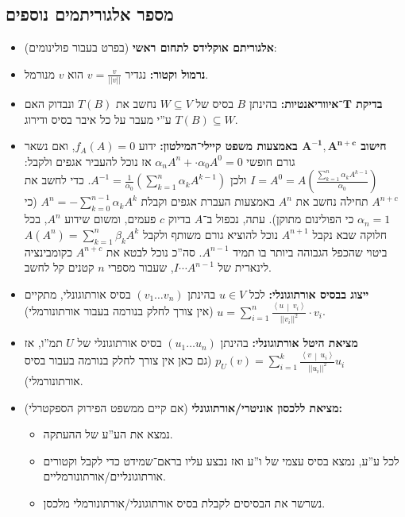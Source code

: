 \documentclass[a4paper]{article}
\newcommand\ra    {\rangle}
\newcommand\la    {\langle}
\newcommand\sumnko    {\sum_{k = 1}^{n}}
\newcommand\sumnio    {\sum_{i = 1}^{n}}
\newcommand\norm[1]   {\left \vert \left \vert #1 \right \vert \right \vert}
\newcommand\mut [2]   {\left \la #1 \,\middle\vert\, #2 \right \ra}
\newcommand\ag        {\alpha}
\newcommand\bg        {\beta}
\newcommand\op    {^{-1}}
\newcommand\cl [1]    {\left ( #1 \right )}
\theoremstyle{definition}
\begin{document}
	\subsection{מספר אלגוריתמים נוספים}
	\begin{itemize}
		\item \textbf{אלגוריתם אוקלידס לתחום ראשי} (בפרט בעבור פולינומים): 
		\item \textbf{נרמול וקטור: }נגדיר $v = \frac{v}{\norm{v}}$ הוא $v$ מנורמל. 
		\item \textbf{בדיקת $\bm{T}$־איווריאנטיות: }בהינתן $B$ בסיס של $W \subseteq V$ נחשב את $T(B)$ ונבדוק האם $T(B) \subseteq W$ ע''י מעבר על כל איבר בסיס ודירוג. 
		\item \textbf{חישוב $\bm{A\op, A^{n + c}}$ באמצעות משפט קיילי־המילטון: }ידוע $f_A(A) = 0$, ואם נשאר גורם חופשי $\ag_nA^{n} + \cdot \ag_0 A^{0} = 0$ אז נוכל להעביר אגפים ולקבל: $I = A^0 = A\cl{\frac{\sum_{k = 1}^{n}\ag_kA^{k - 1}}{\ag_0}}$ ולכן $A\op = \frac{1}{\ag_0}\cl{\sumnko \ag_k A^{k - 1}}$. כדי לחשב את $A^{n + c}$ תחילה נחשב את $A^{n}$ באמצעות העברת אגפים וקבלת $A^{n} = -\sum_{k = 0}^{n - 1} \ag_kA^{k}$ (כי $\ag_n = 1$ כי הפולינום מתוקן). עתה, נכפול ב־$A$ בדיוק $c$ פעמים, ומשום שידוע $A^{n}$, בכל חלוקה שבא נקבל $A^{n + 1}$ נוכל להוציא גורם משותף ולקבל $A(A^{n}) = \sumnko \bg_kA^{k}$ ביטוי שהכפל הגבוהה ביותר בו תמיד $A^{n - 1}$. סה''כ נוכל לבטא את $A^{n + c}$ כקומבינציה לינארית של $I \cdots A^{n - 1}$, שעבור מספרי $n$ קטנים קל לחשב. 
		\item \textbf{ייצוג בבסיס אורתוגונלי: }לכל $u \in V$ בהינתן $(v_1 \dots v_n)$ בסיס אורתוגונלי, מתקיים $u = \sumnio \frac{\mut{u}{v_i}}{\norm{v_i}^{2}} \cdot v_i$ (אין צורך לחלק בנורמה בעבור אורתונורמלי). 
		\item \textbf{מציאת היטל אורתוגונלי: }בהינתן $(u_1 \dots u_n)$ בסיס אורתוגונלי של $U$ תמ''ו, אז $p_U(v) = \sum_{i = 1}^{k}\frac{\mut{v}{u_i}}{\norm{u_i}^2}u_i$ (גם כאן אין צורך לחלק בנורמה בעבור בסיס אורתונורמלי). 
		\item \textbf{מציאת ללכסון אוניטרי/אורתוגונלי} (אם קיים ממשפט הפירוק הספקטרלי)\textbf{: }
		\begin{itemize}
			\item נמצא את הע''ע של ההעתקה. 
			\item לכל ע''ע, נמצא בסיס עצמי של ו''ע ואז נבצע עליו בראם־שמידט כדי לקבל וקטורים אורתוגונליים/אורתונורמליים. 
			\item נשרשר את הבסיסים לקבלת בסיס אורתוגונלי/אורתונורמלי מלכסן. 
		\end{itemize}
	\end{itemize}
	
\end{document}
